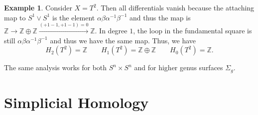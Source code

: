 \documentclass[leqno, openany]{memoir}
\theoremstyle{definition}
\newtheorem{exm}[thm]{Example}
\theoremstyle{remark}
\theoremstyle{plain}
\theoremstyle{definition}
\theoremstyle{remark}
\newcommand{\Z}{\mathbb{Z}}
\begin{document}
\begin{exm}
    Consider $X = T^2$. Then all differentials vanish because the attaching map to $S^1 \vee S^1$ is the element $\alpha \beta \alpha^{-1} \beta^{-1}$ and thus the map is $\Z \to \Z \oplus \Z \xrightarrow{(+1-1, +1-1) = 0} \Z$. In degree $1$, the loop in the fundamental square is still $\alpha \beta \alpha^{-1} \beta^{-1}$ and thus we have the same map. Thus, we have
    \[ H_2(T^2) = \Z \qquad H_1(T^2) = \Z \oplus \Z \qquad H_0(T^2) = \Z. \]
\end{exm}

The same analysis works for both $S^n \times S^n$ and for higher genus surfaces $\Sigma_g$.

\section{Simplicial Homology}%
\label{sec:simplicial_homology}
\end{document}
